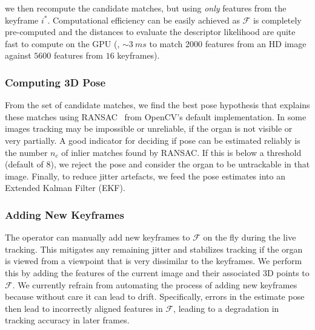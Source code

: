 we then recompute the candidate matches, but using \emph{only} features from the keyframe $i^*$.
Computational efficiency can be easily achieved as $\mathcal{F}$ is completely pre-computed and the distances to evaluate the descriptor likelihood are quite fast to compute on the GPU (\eg, $\sim\SI{3}{ms}$ to match $2000$ features from an HD image against $5600$ features from $16$ keyframes).

\subsubsection{Computing 3D Pose}
From the set of candidate matches, we find the best pose hypothesis that explains these  matches using   RANSAC~\cite{Fischler:1981:RSC:358669.358692} from OpenCV's default implementation.
In some images tracking may be impossible or unreliable, if the organ is not visible or very partially. A good indicator for deciding if pose can be estimated reliably is the number $n_c$ of inlier matches found by RANSAC. If this is below a threshold (default of $8$), we reject the pose and consider the organ to be untrackable in that image. Finally, to reduce jitter artefacts, we feed the pose estimates into an Extended Kalman Filter (EKF). 

\subsubsection{Adding New Keyframes}
The operator can manually add new keyframes to $\mathcal{F}$ on the fly during the live tracking.
This mitigates any remaining jitter and stabilizes tracking if the organ is viewed from a viewpoint that is very dissimilar to the keyframes.
We perform this by adding the features of the current image and their associated 3D points to $\mathcal{F}$.
We currently refrain from automating the process of adding new keyframes because without care it can lead to drift.
Specifically, errors in the estimate pose then lead to incorrectly aligned features in $\mathcal{F}$, leading to a degradation in tracking accuracy in later frames.

